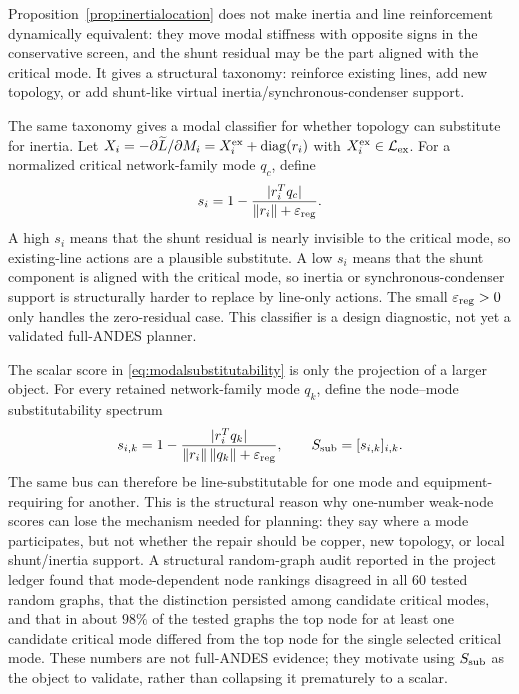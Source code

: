 \documentclass[journal]{IEEEtran}
\newcommand{\Lt}{\widetilde L}
\newcommand{\diag}{\operatorname{diag}}
\newcommand{\norm}[1]{\left\lVert #1 \right\rVert}
\begin{document}
Proposition~\ref{prop:inertialocation} does not make inertia and line reinforcement dynamically equivalent: they move modal stiffness with opposite signs in the conservative screen, and the shunt residual may be the part aligned with the critical mode. It gives a structural taxonomy: reinforce existing lines, add new topology, or add shunt-like virtual inertia/synchronous-condenser support.

The same taxonomy gives a modal classifier for whether topology can substitute for inertia. Let $X_i=-\partial\Lt/\partial M_i=X_i^{\rm ex}+\diag(r_i)$ with $X_i^{\rm ex}\in\mathcal{L}_{\rm ex}$. For a normalized critical network-family mode $q_c$, define
\begin{equation}
s_i=1-\frac{|r_i^Tq_c|}{\norm{r_i}+\varepsilon_{\rm reg}}.
\label{eq:modalsubstitutability}
\end{equation}
A high $s_i$ means that the shunt residual is nearly invisible to the critical mode, so existing-line actions are a plausible substitute. A low $s_i$ means that the shunt component is aligned with the critical mode, so inertia or synchronous-condenser support is structurally harder to replace by line-only actions. The small $\varepsilon_{\rm reg}>0$ only handles the zero-residual case. This classifier is a design diagnostic, not yet a validated full-ANDES planner.

The scalar score in \eqref{eq:modalsubstitutability} is only the projection of a larger object. For every retained network-family mode $q_k$, define the node--mode substitutability spectrum
\begin{equation}
s_{i,k}
=1-\frac{|r_i^Tq_k|}
{\norm{r_i}\norm{q_k}+\varepsilon_{\rm reg}},
\qquad
S_{\rm sub}=[s_{i,k}]_{i,k}.
\label{eq:modalsubstitutabilityspectrum}
\end{equation}
The same bus can therefore be line-substitutable for one mode and equipment-requiring for another. This is the structural reason why one-number weak-node scores can lose the mechanism needed for planning: they say where a mode participates, but not whether the repair should be copper, new topology, or local shunt/inertia support. A structural random-graph audit reported in the project ledger found that mode-dependent node rankings disagreed in all $60$ tested random graphs, that the distinction persisted among candidate critical modes, and that in about $98\%$ of the tested graphs the top node for at least one candidate critical mode differed from the top node for the single selected critical mode. These numbers are not full-ANDES evidence; they motivate using $S_{\rm sub}$ as the object to validate, rather than collapsing it prematurely to a scalar.
\end{document}
